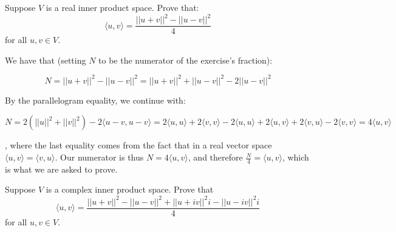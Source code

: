 \begin{exercise}{19}
Suppose $V$ is a real inner product space. Prove that:
$$\langle u, v \rangle = \frac{\lvert \lvert u + v \rvert \rvert^2 - \lvert \lvert u - v \rvert \rvert^2}{4}$$
for all $u, v \in V$.
\end{exercise}

\begin{solution}

We have that (setting $N$ to be the numerator of the exercise's fraction):

$$N = \lvert \lvert u + v \rvert \rvert^2 - \lvert \lvert u - v \rvert \rvert^2 = \lvert \lvert u + v \rvert \rvert^2 + \lvert \lvert u - v \rvert \rvert^2 - 2 \lvert \lvert u - v \rvert \rvert ^2$$

By the parallelogram equality, we continue with:

$$N = 2(\lvert \lvert u \rvert \rvert^2 + \lvert \lvert v \rvert \rvert^2) - 2 \langle u - v, u - v \rangle  = 2\langle u, u \rangle + 2 \langle v, v \rangle - 2 \langle u, u \rangle + 2 \langle u, v \rangle + 2 \langle v, u \rangle -2\langle v, v \rangle = 4 \langle u, v \rangle$$

, where the last equality comes from the fact that in a real vector space $\langle u, v \rangle = \langle v, u \rangle$. Our numerator is thus $N = 4 \langle u, v \rangle$, and therefore $\frac{N}{4} = \langle u, v \rangle$, which is what we are asked to prove.
\end{solution}

\begin{exercise}{20}
Suppose $V$ is a complex inner product space. Prove that
$$\langle u, v \rangle = \frac{\lvert \lvert u + v \rvert \rvert^2 - \lvert \lvert u - v \rvert \rvert^2 + \lvert \lvert u + iv \rvert \rvert^2 i - \lvert \lvert u - iv \rvert \rvert^2 i}{4}$$
for all $u, v \in V$.
\end{exercise}


